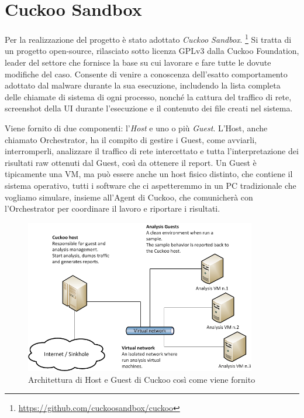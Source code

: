 \section{Cuckoo Sandbox}
Per la realizzazione del progetto è stato adottato \emph{Cuckoo Sandbox}.
\footnote{\url{https://github.com/cuckoosandbox/cuckoo}}
Si tratta di un progetto open-source, rilasciato sotto licenza GPLv3 dalla Cuckoo Foundation, leader del settore che fornisce la base su cui lavorare e fare tutte le dovute modifiche del caso.
Consente di venire a conoscenza dell'esatto comportamento adottato dal malware durante la sua esecuzione, includendo la lista completa delle chiamate di sistema di ogni processo, nonché la cattura del traffico di rete, screenshot della UI durante l'esecuzione e il contenuto dei file creati nel sistema.

Viene fornito di due componenti: l'\emph{Host} e uno o più \emph{Guest}.
L'Host, anche chiamato Orchestrator, ha il compito di gestire i Guest, come avviarli, interromperli, analizzare il traffico di rete intercettato e tutta l'interpretazione dei risultati raw ottenuti dal Guest, così da ottenere il report.
Un Guest è tipicamente una VM, ma può essere anche un host fisico distinto, che contiene il sistema operativo, tutti i software che ci aspetteremmo in un PC tradizionale che vogliamo simulare, insieme all'Agent di Cuckoo, che comunicherà con l'Orchestrator per coordinare il lavoro e riportare i risultati.

\begin{figure}[htbp]
    \centering
    \includegraphics[width=0.9\textwidth]{assets/cuckoo_default_architecture.png}
    \caption{Architettura di Host e Guest di Cuckoo così come viene fornito}
    \label{fig:cuckoo_default_architecture}
\end{figure}

